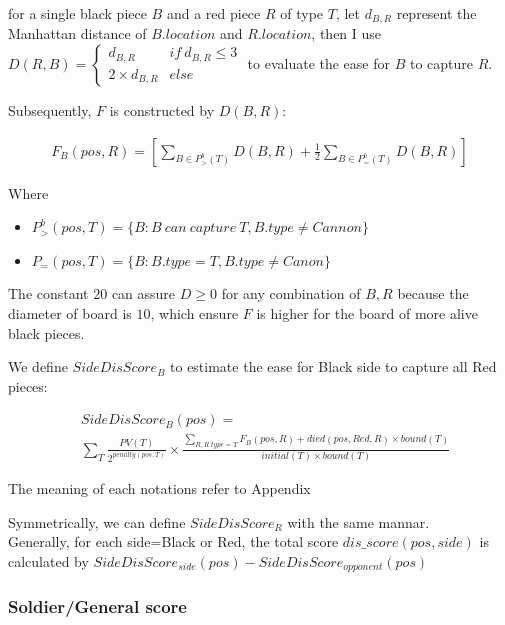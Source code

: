 \documentclass[a4paper, 12pt]{article}  %
\begin{document}
for a single black piece $B$ and a red piece $R$ of type $T$, let $d_{B,R}$ represent the Manhattan distance of $B.location$ and $R.location$, then I use
$D(R,B) = \begin{cases}
d_{B,R} & if\ d_{B,R} \le 3\\
2\times d_{B,R}&else
\end{cases}$ to evaluate the ease for $B$ to capture $R$.

Subsequently, $F$ is constructed by $D(B,R)$:

\begin{align*}
F_B(pos, R) = \left[\sum_{B\in P^b_>(T)} D(B,R) + \frac 12 \sum_{B\in P^b_=(T)} D(B,R)\right]
\end{align*}

Where

\begin{itemize}
  \item $P^b_>(pos, T) = \{B: B\ can\ capture\ T,B.type \neq Cannon\}$
  \item $P_=(pos, T) = \{B : B.type=T, B.type\neq Canon\}$
\end{itemize}



The constant $20$ can assure $D\ge 0$ for any combination of $B,R$ because the diameter of board is $10$, which ensure $F$ is higher for the board of more alive black pieces.

We define $SideDisScore_B$ to estimate the ease for Black side to capture all Red pieces:

\begin{align*}
  &SideDisScore_B(pos) =\\&\sum_{T} \frac{PV(T)}{2^{penalty(pos, T)}}\times \frac{\sum_{R,R.type = T} F_B(pos, R) + died(pos, Red, R)\times bound(T)}{initial(T)\times bound(T)}
\end{align*}

The meaning of each notations refer to Appendix

Symmetrically, we can define $SideDisScore_R$ with the same mannar.\\
Generally, for each side=Black or Red, the total score $dis\_score(pos, side)$ is calculated by $SideDisScore_{side}(pos) - SideDisScore_{opponent}(pos)$

\subsubsection{Soldier/General score}
\end{document}
